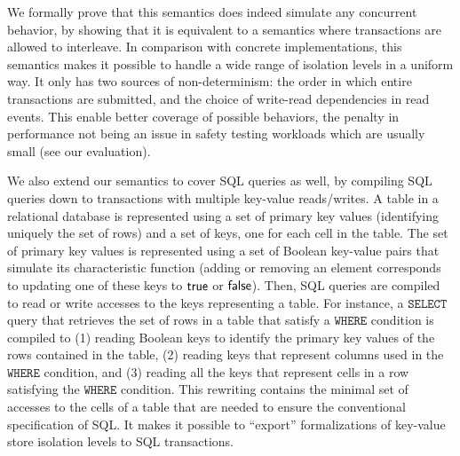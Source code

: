 We formally prove that this semantics does indeed simulate any concurrent behavior, by 
showing that it is equivalent to a semantics where transactions are allowed to interleave.
In comparison with concrete implementations, this semantics makes it possible to handle 
a wide range of isolation levels in a uniform way. It only has two sources of
non-determinism: 
the order in which entire transactions are submitted, and the choice of write-read dependencies in read 
events. This enable better coverage of possible behaviors, the penalty in performance not
being an issue in safety testing workloads which are usually small (see our evaluation). 


We also extend our semantics to cover SQL queries as well, by compiling SQL queries down to transactions with multiple key-value reads/writes. A table in a relational database is represented using a set of primary key values (identifying uniquely the set of rows) and a set of keys, one for each cell in the table. The set of primary key values is represented using a set of Boolean key-value pairs that simulate its characteristic function (adding or removing an element corresponds to updating one of these keys to $\mathsf{true}$ or $\mathsf{false}$). Then, SQL queries are compiled to read or write accesses to the keys representing a table. For instance, a $\mathtt{SELECT}$ query that retrieves the set of rows in a table that satisfy a $\mathtt{WHERE}$ condition is compiled to (1) reading Boolean keys to identify the primary key values of the rows contained in the table, (2) reading keys that represent columns used in the $\mathtt{WHERE}$ condition, and (3) reading all the keys that represent cells in a row satisfying the $\mathtt{WHERE}$ condition. This rewriting contains the minimal set of accesses to the cells of a table that are needed to ensure the conventional specification of SQL.
It makes it possible to ``export'' formalizations of key-value store isolation levels to SQL transactions.


